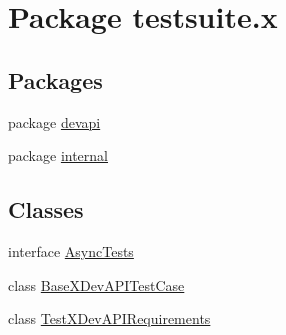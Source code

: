 \hypertarget{namespacetestsuite_1_1x}{}\section{Package testsuite.\+x}
\label{namespacetestsuite_1_1x}
\subsection*{Packages}
\begin{DoxyCompactItemize}
\item 
package \mbox{\hyperlink{namespacetestsuite_1_1x_1_1devapi}{devapi}}
\item 
package \mbox{\hyperlink{namespacetestsuite_1_1x_1_1internal}{internal}}
\end{DoxyCompactItemize}
\subsection*{Classes}
\begin{DoxyCompactItemize}
\item 
interface \mbox{\hyperlink{interfacetestsuite_1_1x_1_1_async_tests}{Async\+Tests}}
\item 
class \mbox{\hyperlink{classtestsuite_1_1x_1_1_base_x_dev_a_p_i_test_case}{Base\+X\+Dev\+A\+P\+I\+Test\+Case}}
\item 
class \mbox{\hyperlink{classtestsuite_1_1x_1_1_test_x_dev_a_p_i_requirements}{Test\+X\+Dev\+A\+P\+I\+Requirements}}
\end{DoxyCompactItemize}
